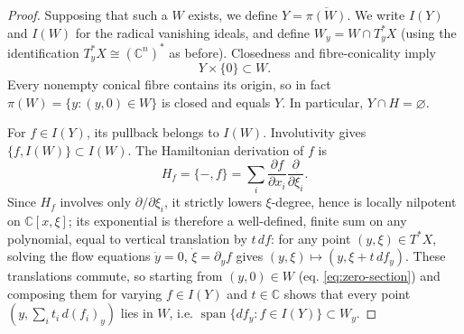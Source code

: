 \documentclass[11pt]{amsart}
\numberwithin{equation}{section}
\theoremstyle{plain}
\theoremstyle{remark}
\begin{document}
\begin{proof}
Supposing that such a $W$ exists, we define $Y=\overline{\pi(W)}$. We write $I(Y)$
and $I(W)$ for the radical vanishing ideals, and define
$W_y=W\cap T_y^*X$ (using the identification $T_y^*X\cong (\mathbb C^n)^*$ as before). Closedness and
fibre-conicality imply
\begin{equation}
 Y\times\{0\}\subset W.
 \label{eq:zero-section}
\end{equation}
Every nonempty conical fibre contains its origin, so in fact
$\pi(W)=\{y:(y,0)\in W\}$ is closed and equals $Y$. In particular,
$Y\cap H=\varnothing$.

For $f\in I(Y)$, its pullback belongs to $I(W)$. Involutivity gives
$\{f,I(W)\}\subset I(W)$. The Hamiltonian derivation of $f$ is
\[
 H_f=\{-,f\}=\sum_i\frac{\partial f}{\partial x_i}
 \frac{\partial}{\partial\xi_i}.
\]
Since $H_f$ involves only $\partial/\partial\xi_i$, it strictly lowers
$\xi$-degree, hence is locally nilpotent on $\mathbb C[x,\xi]$; its
exponential  is therefore a well-defined, finite sum on any polynomial,
equal to vertical translation by $t\,df$: for any point $(y, \xi) \in T^*X$, solving the flow equations
$\dot y=0$, $\dot\xi=\partial_yf$ gives $(y,\xi)\mapsto(y,\xi+t\,df_y)$.
 These translations commute, so starting from $(y,0)\in W$ (eq. \eqref{eq:zero-section}) and composing them for varying $f\in I(Y)$ and $t\in\mathbb C$ shows that every point $(y,\sum_it_i\,d(f_i)_y)$ lies in
$W$, i.e. $\operatorname{span}\{df_y: f \in I(Y)\}\subset W_y$. %


\end{proof}
\end{document}
